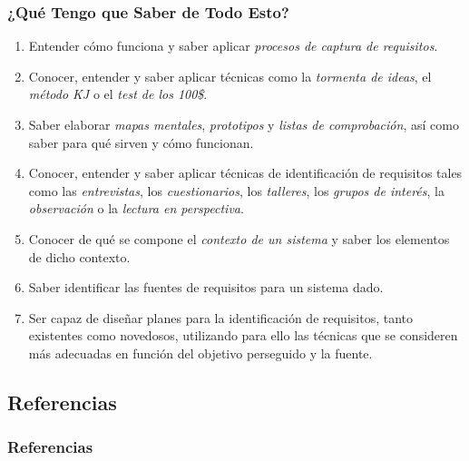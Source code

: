 ﻿\documentclass[handout,a4paper,slidestop,xcolor=pst,dvips,blue]{beamer}
\begin{document}
\begin{frame}
    \frametitle{¿Qué Tengo que Saber de Todo Esto?}
    \begin{enumerate}
        \item Entender cómo funciona  y saber aplicar \emph{procesos de captura de requisitos}.
        \item Conocer, entender y saber aplicar técnicas como la \emph{tormenta de ideas}, el \emph{método KJ} o el \emph{test de los 100\$}.
        \item Saber elaborar \emph{mapas mentales}, \emph{prototipos} y \emph{listas de comprobación}, así como saber para qué sirven y cómo funcionan.
        \item Conocer, entender y saber aplicar técnicas de identificación de requisitos tales como las \emph{entrevistas}, los \emph{cuestionarios}, los \emph{talleres}, los \emph{grupos de interés}, la \emph{observación} o la \emph{lectura en perspectiva}.
        \item Conocer de qué se compone el \emph{contexto de un sistema} y saber los elementos de dicho contexto.
        \item Saber identificar las fuentes de requisitos para un sistema dado.
        \item Ser capaz de diseñar planes para la identificación de requisitos, tanto existentes como novedosos, utilizando para ello las técnicas que se consideren más adecuadas en función del objetivo perseguido y la fuente.
    \end{enumerate}
\end{frame}

 \subsection{Referencias}

\begin{frame}[allowframebreaks]
	\frametitle{Referencias}
	
	
\end{frame}
\end{document}
